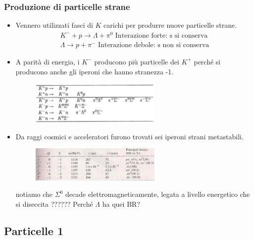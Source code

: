 \subsubsection{Produzione di particelle strane}
\begin{itemize}
    \item Vennero utilizzati fasci di $K$ carichi per produrre nuove particelle strane. 
    \begin{gather*}
        K^-+p\to\Lambda+\pi^0\text{ Interazione forte: s si conserva}\\
        \Lambda\to p+\pi^-\text{ Interazione debole: s non si conserva}
    \end{gather*}
    \item A parità di energia, i $K^-$ producono più particelle
    dei $K^+$ perché si producono anche gli iperoni che hanno stranezza -1.
    \begin{figure}[H]
        \centering
        \includegraphics[width=0.6\textwidth]{immagini/fig_strange_prod.png}
        \caption{}
      \end{figure}
    \item Da raggi cosmici e acceleratori furono trovati sei iperoni strani metastabili.
    \begin{figure}[H]
        \centering
        \includegraphics[width=0.6\textwidth]{immagini/fig_iperoni_strani.png}
    \end{figure}
    notiamo che $\Sigma^0$ decade elettromagneticamente, legata a livello energetico che si diseccita ?????? Perché $\Lambda$ ha quei BR?
\end{itemize}
\subsection{Particelle 1}
